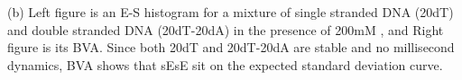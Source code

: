 \label{fig:bva_static}(b) Left figure is an E-S histogram for a mixture of single stranded DNA (20dT) and double stranded DNA (20dT-20dA) in the presence of 200mM , and Right figure is its BVA. Since both 20dT and 20dT-20dA are stable and no millisecond dynamics, BVA shows that sEsE sit on the expected standard deviation curve.